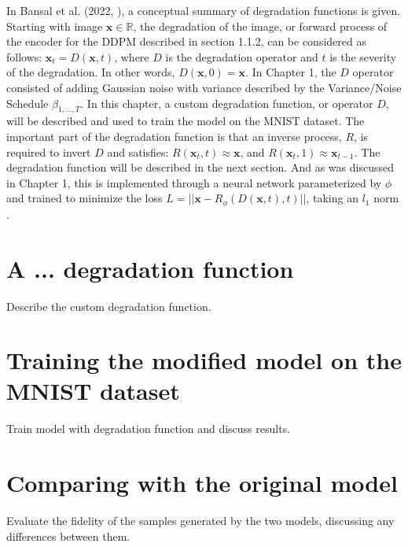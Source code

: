 \documentclass[12pt]{report} %
\begin{document}
In Bansal et al. (2022, \cite{bansal2022cold}), a conceptual summary of degradation functions is given. Starting with image $\mathbf{x} \in \mathbb{R}$, the degradation of the image, or forward process of the encoder for the DDPM described in section 1.1.2, can be considered as follows: $\mathbf{x}_{t} = D(\mathbf{x}, t)$, where $D$ is the degradation operator and $t$ is the severity of the degradation. In other words, $D(\mathbf{x}, 0) = \mathbf{x}$. In Chapter 1, the $D$ operator consisted of adding Gaussian noise with variance described by the Variance/Noise Schedule $\beta_{1, \dots, T}$. In this chapter, a custom degradation function, or operator $D$, will be described and used to train the model on the MNIST dataset. The important part of the degradation function is that an inverse process, $R$, is required to invert $D$ and satisfies: $R(\mathbf{x}_t, t) \approx \mathbf{x}$, and $R(\mathbf{x}_t, 1) \approx \mathbf{x}_{t-1}$. The degradation function will be described in the next section. And as was discussed in Chapter 1, this is implemented through a neural network parameterized by $\phi$ and trained to minimize the loss $L = ||\mathbf{x} - R_{\phi}(D(\mathbf{x}, t), t)||$, taking an $l_{1}$ norm \cite{bansal2022cold}.

\section{A ... degradation function}



Describe the custom degradation function.

\section{Training the modified model on the MNIST dataset}

Train model with degradation function and discuss results.

\section{Comparing with the original model}

Evaluate the fidelity of the samples generated by the two models, discussing any differences between them.






\end{document}
